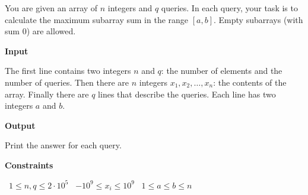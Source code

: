 You are given an array of $n$ integers and $q$ queries. In each query, your task is to calculate the maximum subarray sum in the range $[a,b]$.
Empty subarrays (with sum $0$) are allowed.

\vspace{0.3cm}\noindent\textbf{Input}

The first line contains two integers $n$ and $q$: the number of elements and the number of queries.
Then there are $n$ integers $x_1,x_2,\ldots,x_n$: the contents of the array.
Finally there are $q$ lines that describe the queries. Each line has two integers $a$ and $b$.

\vspace{0.3cm}\noindent\textbf{Output}

Print the answer for each query.

\vspace{0.3cm}\noindent\textbf{Constraints}

\textbullet\ $1 \le n, q\le 2 \cdot 10^5$
\textbullet\ $-10^9 \le x_i \le 10^9$
\textbullet\ $1 \le a \le b \le n$